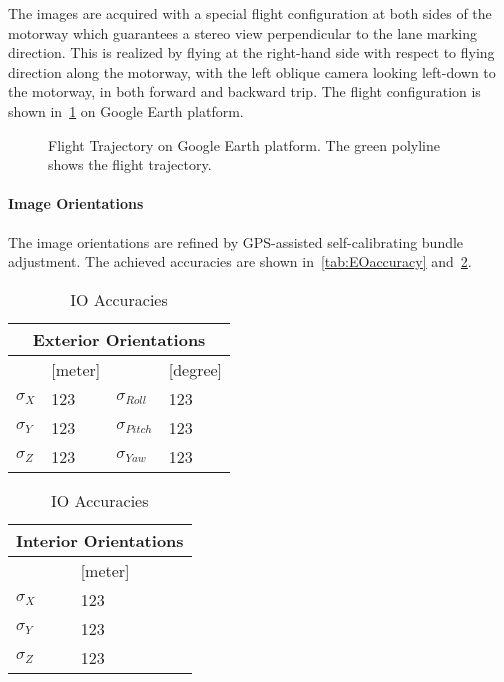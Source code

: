 \clearpage

The images are acquired with a special flight configuration at both sides of the motorway which guarantees a stereo view perpendicular to the lane marking direction. This is realized by flying at the right-hand side with respect to flying direction along the motorway, with the left oblique camera looking left-down to the motorway, in both forward and backward trip. The flight configuration is shown in~\cref{fig:FlightTrajectory} on Google Earth platform.

\begin{figure}%
  \centering
  \caption{Flight Trajectory on Google Earth platform. The green polyline shows the flight trajectory.}
  \label{fig:FlightTrajectory}
\end{figure}


\paragraph{Image Orientations}
The image orientations are refined by GPS-assisted self-calibrating bundle adjustment.
The achieved accuracies are shown in~\cref{tab:EOaccuracy} and~\cref{tab:IOaccuracy}.

\begin{table}[!h]
  \parbox{.45\linewidth}{
    \centering
    \begin{tabular}{ll|ll}
    \toprule
    \multicolumn{4}{c}{Exterior Orientations} \\
    \midrule
                &[meter] &                  & [degree]\\
    \hline
    $\sigma_X$  & 123    & $\sigma_{Roll}$  & 123\\
    $\sigma_Y$  & 123    & $\sigma_{Pitch}$ & 123\\
    $\sigma_Z$  & 123    & $\sigma_{Yaw}$   & 123\\
    \bottomrule
    \end{tabular}
    \label{tab:EOaccuracy}
    \caption{EO Accuracies}
  }
  \hfill
  \parbox{.45\linewidth}{
    \centering
    \begin{tabular}{ll}
    \toprule
    \multicolumn{2}{c}{Interior Orientations} \\
    \midrule
                &[meter]\\
    \hline
    $\sigma_X$  & 123\\
    $\sigma_Y$  & 123\\
    $\sigma_Z$  & 123\\
    \bottomrule
    \end{tabular}
    \label{tab:IOaccuracy}
    \caption{IO Accuracies}
  }
\end{table}

